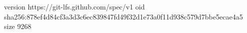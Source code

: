 version https://git-lfs.github.com/spec/v1
oid sha256:878ef4d84cf3a3d3c6ec839847fd49f32d1e73a0f11d938c579d7bbe5ecae4a5
size 9268
